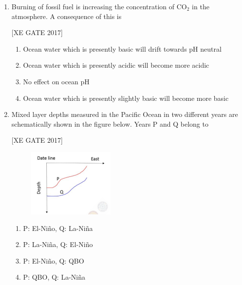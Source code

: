 \documentclass[journal,12pt,onecolumn]{IEEEtran}
\theoremstyle{remark}
\begin{document}
\begin{enumerate}
    
    \hfill [XE GATE 2017]
    

    \begin{multicols}{2}
        \begin{enumerate}
            \item $T_v > T > T_w > T_d$
            \item $T_v \geq T \geq T_w \geq T_d$
            \item $T_v > T \geq T_w \geq T_d$
            \item $T > T_v > T_w > T_d$
        \end{enumerate}
    \end{multicols}
    
    \item Burning of fossil fuel is increasing the concentration of CO$_2$ in the atmosphere. A consequence of this is
    
    
    \hfill [XE GATE 2017]
    
    
\begin{multicols}{2}
        \begin{enumerate}
            \item Ocean water which is presently basic will drift towards pH neutral
            \item Ocean water which is presently acidic will become more acidic
            \item No effect on ocean pH
            \item Ocean water which is presently slightly basic will become more basic
        \end{enumerate}
    \end{multicols}
\item Mixed layer depths measured in the Pacific Ocean in two different years are schematically shown in the figure below.
Years P and Q belong to

 \hfill [XE GATE 2017]

\begin{figure}[H]
    \centering
    \includegraphics[width=0.5\linewidth]{figs/fig36.png}
    \caption{}
    \label{fig:placeholder}
\end{figure}
\begin{multicols}{2}
\begin{enumerate}
    \item P: El-Ni\~no, Q: La-Ni\~na
    \item P: La-Ni\~na, Q: El-Ni\~no
    \item P: El-Ni\~no, Q: QBO
    \item P: QBO, Q: La-Ni\~na
\end{enumerate}
\end{multicols}


\end{enumerate}
\end{document}
